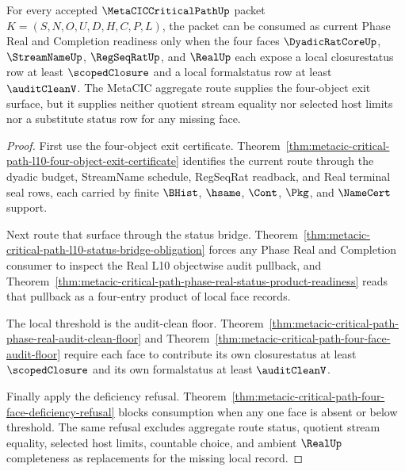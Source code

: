 \begin{theorem}
\label{thm:metacic-critical-path-l10-four-face-closure-readiness}
For every accepted $\MetaCICCriticalPathUp$ packet $K=(S,N,O,U,D,H,C,P,L)$, the packet can be consumed as current Phase Real and Completion readiness only when the four faces $\DyadicRatCoreUp$, $\StreamNameUp$, $\RegSeqRatUp$, and $\RealUp$ each expose a local closurestatus row at least $\scopedClosure$ and a local formalstatus row at least $\auditCleanV$. The MetaCIC aggregate route supplies the four-object exit surface, but it supplies neither quotient stream equality nor selected host limits nor a substitute status row for any missing face.
\end{theorem}
\begin{proof}
First use the four-object exit certificate. Theorem~\ref{thm:metacic-critical-path-l10-four-object-exit-certificate} identifies the current route through the dyadic budget, StreamName schedule, RegSeqRat readback, and Real terminal seal rows, each carried by finite $\BHist$, $\hsame$, $\Cont$, $\Pkg$, and $\NameCert$ support.

Next route that surface through the status bridge. Theorem~\ref{thm:metacic-critical-path-l10-status-bridge-obligation} forces any Phase Real and Completion consumer to inspect the Real L10 objectwise audit pullback, and Theorem~\ref{thm:metacic-critical-path-phase-real-status-product-readiness} reads that pullback as a four-entry product of local face records.

The local threshold is the audit-clean floor. Theorem~\ref{thm:metacic-critical-path-phase-real-audit-clean-floor} and Theorem~\ref{thm:metacic-critical-path-four-face-audit-floor} require each face to contribute its own closurestatus at least $\scopedClosure$ and its own formalstatus at least $\auditCleanV$.

Finally apply the deficiency refusal. Theorem~\ref{thm:metacic-critical-path-four-face-deficiency-refusal} blocks consumption when any one face is absent or below threshold. The same refusal excludes aggregate route status, quotient stream equality, selected host limits, countable choice, and ambient $\RealUp$ completeness as replacements for the missing local record.
\end{proof}

